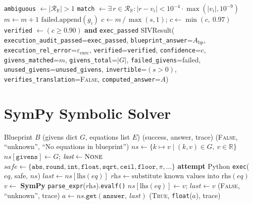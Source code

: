 \documentclass[11pt,a4paper]{article}
\begin{document}
\begin{algorithm}[H]
\begin{algorithmic}[1]
    \State \texttt{ambiguous} $\gets |\mathcal{R}_{\mathbb{R}}| > 1$
    \State \texttt{match} $\gets \exists\, r \in \mathcal{R}_{\mathbb{R}} : |r - v_i| < 10^{-4} \cdot \max(|v_i|, 10^{-9})$
        \State $m \gets m + 1$
    \Else
        \State $\text{failed}.\text{append}(g_i)$
    \EndIf
\EndFor
\State $c \gets m \,/\, \max(s, 1)$; \quad $c \gets \min(c,\ 0.97)$ 
\State \texttt{verified} $\gets (c \geq 0.90)$ \textbf{and} \texttt{exec\_passed}
\State \Return SIVResult(
    \texttt{execution\_audit\_passed}=\texttt{exec\_passed},
    \texttt{blueprint\_answer}=$A_{\text{bp}}$,
    \texttt{execution\_rel\_error}=$\varepsilon_{\text{exec}}$,
    \texttt{verified}=\texttt{verified}, \texttt{confidence}=$c$,
    \texttt{givens\_matched}=$m$, \texttt{givens\_total}=$|G|$,
    \texttt{failed\_givens}=failed,
    \texttt{unused\_givens}=\texttt{unused\_givens},
    \texttt{invertible}=$(s > 0)$,
    \texttt{verifies\_translation}=\textsc{False},
    \texttt{computed\_answer}=$A$)
\end{algorithmic}
\end{algorithm}
\section{SymPy Symbolic Solver}
\label{app:sympy}
\begin{algorithm}[H]
\caption{SymPy Symbolic Solver (both invocation points)}
\label{alg:sympy}
\begin{algorithmic}[1]
\Require Blueprint $B$ (givens dict $G$, equations list $E$)
\Ensure (success, answer, trace)
    \State \Return (\textsc{False}, ``unknown'', ``No equations in blueprint'')
\EndIf
\State $\textit{ns} \gets \{k \mapsto v \mid (k,v) \in G,\ v \in \mathbb{R}\}$ 
\State $\textit{ns}[\texttt{givens}] \gets G$; \quad $\textit{last} \gets \textsc{None}$
\State $\textit{safe} \gets \{\texttt{abs}, \texttt{round}, \texttt{int}, \texttt{float}, \texttt{sqrt}, \texttt{ceil}, \texttt{floor}, \pi, \ldots\}$
    \State \textbf{attempt} Python \texttt{exec}($\textit{eq}$, safe, $\textit{ns}$)
        \State $\textit{last} \gets \textit{ns}[\text{lhs}(\textit{eq})]$
    \Else
        \State $\textit{rhs} \gets \text{substitute known values into rhs}(\textit{eq})$
        \State $v \gets $ \textbf{SymPy} \texttt{parse\_expr}($\textit{rhs}$).\texttt{evalf()}
            \State $\textit{ns}[\text{lhs}(\textit{eq})] \gets v$; \quad $\textit{last} \gets v$
        \Else
            \State \Return (\textsc{False}, ``unknown'', trace)
        \EndIf
    \EndIf
\EndFor
\State $a \gets \textit{ns}.\texttt{get}(\texttt{answer},\ \textit{last})$
\State \Return (\textsc{True}, \texttt{float}($a$), trace)
\end{algorithmic}
\end{algorithm}
\end{document}
